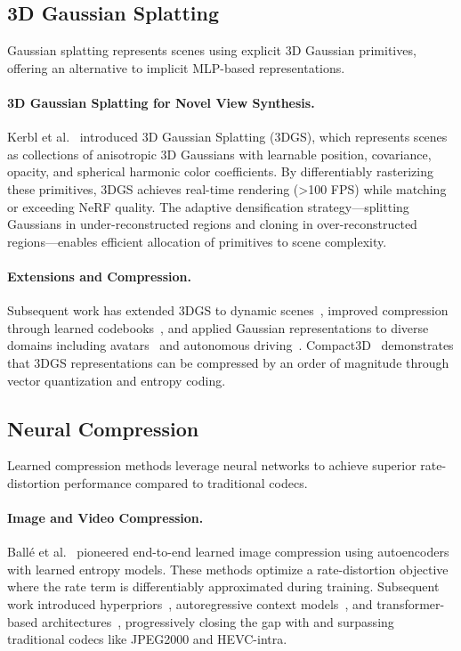 \documentclass[11pt,a4paper]{article}
\begin{document}
\subsection{3D Gaussian Splatting}

Gaussian splatting represents scenes using explicit 3D Gaussian primitives, offering an alternative to implicit MLP-based representations.

\paragraph{3D Gaussian Splatting for Novel View Synthesis.}
Kerbl et al.~\cite{kerbl20233d} introduced 3D Gaussian Splatting (3DGS), which represents scenes as collections of anisotropic 3D Gaussians with learnable position, covariance, opacity, and spherical harmonic color coefficients. By differentiably rasterizing these primitives, 3DGS achieves real-time rendering (>100 FPS) while matching or exceeding NeRF quality. The adaptive densification strategy---splitting Gaussians in under-reconstructed regions and cloning in over-reconstructed regions---enables efficient allocation of primitives to scene complexity.

\paragraph{Extensions and Compression.}
Subsequent work has extended 3DGS to dynamic scenes~\cite{luiten2023dynamic,wu20234dgaussians}, improved compression through learned codebooks~\cite{lee2024compact}, and applied Gaussian representations to diverse domains including avatars~\cite{qian2023gaussianavatars} and autonomous driving~\cite{yan2024street}. Compact3D~\cite{lee2024compact} demonstrates that 3DGS representations can be compressed by an order of magnitude through vector quantization and entropy coding.

\subsection{Neural Compression}

Learned compression methods leverage neural networks to achieve superior rate-distortion performance compared to traditional codecs.

\paragraph{Image and Video Compression.}
Ball\'e et al.~\cite{balle2017end,balle2018variational} pioneered end-to-end learned image compression using autoencoders with learned entropy models. These methods optimize a rate-distortion objective where the rate term is differentiably approximated during training. Subsequent work introduced hyperpriors~\cite{balle2018variational}, autoregressive context models~\cite{minnen2018joint}, and transformer-based architectures~\cite{zhu2022transformer}, progressively closing the gap with and surpassing traditional codecs like JPEG2000 and HEVC-intra.
\end{document}
